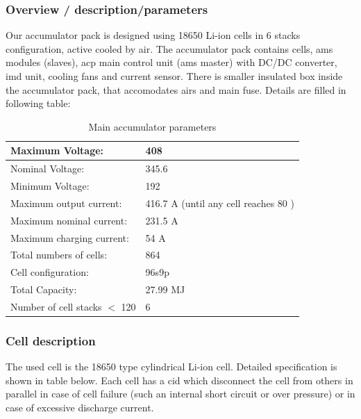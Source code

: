 \subsubsection{Overview / description/parameters}
Our accumulator pack is designed using 18650 Li-ion cells in 6 stacks configuration, active cooled by air. The accumulator pack contains cells, \gls{ams} modules (slaves), \gls{acp} main control unit (\gls{ams} master) with DC/DC converter, \gls{imd} unit, cooling fans and current sensor. There is smaller insulated box inside the accumulator pack, that accomodates \glspl{air} and main fuse.
Details are filled in following table:

\begin{table}[H]
	\centering
	\caption{Main accumulator parameters}
	\begin{tabu}{|X|X|}
		\hline
		Maximum Voltage: & 408 \vdc \\
		\hline
		Nominal Voltage: & 345.6 \vdc \\
		\hline
		Minimum Voltage: & 192 \vdc \\
		\hline
		Maximum output current: & 416.7 A (until any cell reaches 80 \degC) \\
		\hline
		Maximum nominal current: & 231.5 A \\
		\hline
		Maximum charging current: & 54 A \\
		\hline
		Total numbers of cells: & 864 \\
		\hline
		Cell configuration: & 96s9p \\
		\hline
		Total Capacity: & 27.99 MJ \\
		\hline
		Number of cell stacks $<$ 120 \vdc & 6 \\
		\hline
	\end{tabu}%
	\label{tab:acc-main}%
\end{table}%

\subsubsection{Cell description}

The used cell is the 18650 type cylindrical Li-ion cell. Detailed specification is shown in table below. Each cell has a \gls{cid} which disconnect the cell from others in parallel in case of cell failure (such an internal short circuit or over pressure) or in case of excessive discharge current. 

